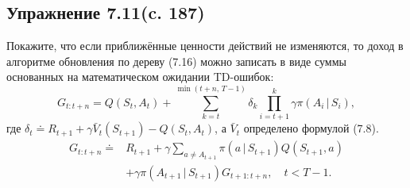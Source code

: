 \subsection{Упражнение 7.11(c. 187)}
Покажите, что если приближённые ценности действий не изменяются, то доход в
алгоритме обновления по дереву (7.16) можно записать в виде суммы основанных
на математическом ожидании TD-ошибок:
\begin{equation*}
    G_{t:t+n} = Q(S_t, A_t)
    + \sum_{k=t}^{\min(t+n,\,T-1)} \delta_k \prod_{i=t+1}^{k} \gamma\pi(A_i\,|\,S_i),
\end{equation*}
где $\delta_t \doteq R_{t+1} + \gamma\bar{V}_t(S_{t+1}) - Q(S_t, A_t)$, а $\bar V_t$
определено формулой (7.8).
\begin{equation}
    \begin{aligned}
    G_{t:t+n} \doteq{}& R_{t+1}
    + \gamma\sum_{a\ne A_{t+1}}\pi(a\,|\,S_{t+1})Q(S_{t+1},a)\\
    &+ \gamma\pi(A_{t+1}\,|\,S_{t+1})G_{t+1:t+n}, \quad t < T-1.
    \end{aligned}
    \tag{7.16}
\end{equation}
